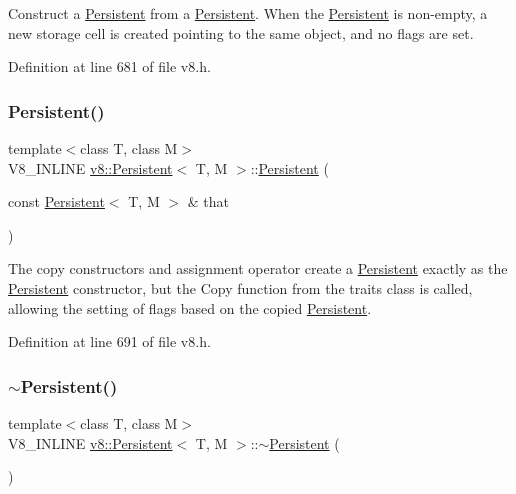 Construct a \mbox{\hyperlink{classv8_1_1Persistent}{Persistent}} from a \mbox{\hyperlink{classv8_1_1Persistent}{Persistent}}. When the \mbox{\hyperlink{classv8_1_1Persistent}{Persistent}} is non-\/empty, a new storage cell is created pointing to the same object, and no flags are set. 

Definition at line 681 of file v8.\+h.

\mbox{\label{classv8_1_1Persistent_a22331e91572784cd5ed5519739bb50c7}} 
\subsubsection{\texorpdfstring{Persistent()}{Persistent()}\hspace{0.1cm}{\footnotesize\ttfamily [4/4]}}
{\footnotesize\ttfamily template$<$class T, class M$>$ \\
V8\+\_\+\+I\+N\+L\+I\+NE \mbox{\hyperlink{classv8_1_1Persistent}{v8\+::\+Persistent}}$<$ T, M $>$\+::\mbox{\hyperlink{classv8_1_1Persistent}{Persistent}} (\begin{DoxyParamCaption}\item[{const \mbox{\hyperlink{classv8_1_1Persistent}{Persistent}}$<$ T, M $>$ \&}]{that }\end{DoxyParamCaption})\hspace{0.3cm}{\ttfamily [inline]}}

The copy constructors and assignment operator create a \mbox{\hyperlink{classv8_1_1Persistent}{Persistent}} exactly as the \mbox{\hyperlink{classv8_1_1Persistent}{Persistent}} constructor, but the Copy function from the traits class is called, allowing the setting of flags based on the copied \mbox{\hyperlink{classv8_1_1Persistent}{Persistent}}. 

Definition at line 691 of file v8.\+h.

\mbox{\label{classv8_1_1Persistent_a7d4d2bebfe3919e447e22adc15464e25}} 
\subsubsection{\texorpdfstring{$\sim$\+Persistent()}{~Persistent()}}
{\footnotesize\ttfamily template$<$class T, class M$>$ \\
V8\+\_\+\+I\+N\+L\+I\+NE \mbox{\hyperlink{classv8_1_1Persistent}{v8\+::\+Persistent}}$<$ T, M $>$\+::$\sim$\mbox{\hyperlink{classv8_1_1Persistent}{Persistent}} (\begin{DoxyParamCaption}{ }\end{DoxyParamCaption})\hspace{0.3cm}{\ttfamily [inline]}}

